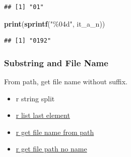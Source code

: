 \documentclass[
]{book}
\newenvironment{Shaded}{\begin{snugshade}}{\end{snugshade}}
\newcommand{\CharTok}[1]{\textcolor[rgb]{0.31,0.60,0.02}{#1}}
\newcommand{\DataTypeTok}[1]{\textcolor[rgb]{0.13,0.29,0.53}{#1}}
\newcommand{\DecValTok}[1]{\textcolor[rgb]{0.00,0.00,0.81}{#1}}
\newcommand{\KeywordTok}[1]{\textcolor[rgb]{0.13,0.29,0.53}{\textbf{#1}}}
\newcommand{\NormalTok}[1]{#1}
\newcommand{\StringTok}[1]{\textcolor[rgb]{0.31,0.60,0.02}{#1}}
\providecommand{\tightlist}{%
  \setlength{\itemsep}{0pt}\setlength{\parskip}{0pt}}
\begin{document}
\begin{verbatim}
## [1] "01"
\end{verbatim}

\begin{Shaded}
\begin{Highlighting}[]
\KeywordTok{print}\NormalTok{(}\KeywordTok{sprintf}\NormalTok{(}\StringTok{"\%04d"}\NormalTok{, it\_a\_n))}
\end{Highlighting}
\end{Shaded}

\begin{verbatim}
## [1] "0192"
\end{verbatim}

\hypertarget{substring-and-file-name}{%
\subsubsection{Substring and File Name}\label{substring-and-file-name}}

From path, get file name without suffix.

\begin{itemize}
\tightlist
\item
  r string split
\item
  \href{https://stackoverflow.com/a/83222/8280804}{r list last element}
\item
  \href{https://stackoverflow.com/a/29114007/8280804}{r get file name from path}
\item
  \href{https://stackoverflow.com/a/47189541/8280804}{r get file path no name}
\end{itemize}

\begin{Shaded}
\end{Shaded}
\end{document}
